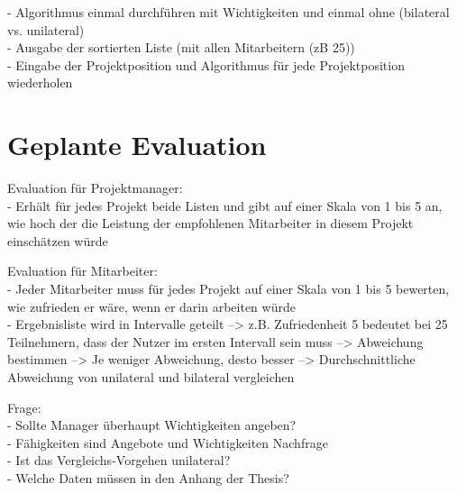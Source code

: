- Algorithmus einmal durchführen mit Wichtigkeiten und einmal ohne (bilateral vs. unilateral)\\
- Ausgabe der sortierten Liste (mit allen Mitarbeitern (zB 25))\\
- Eingabe der Projektposition und Algorithmus für jede Projektposition wiederholen

\section{Geplante Evaluation}
\label{ch:methodik:evaluation}
Evaluation für Projektmanager:\\
- Erhält für jedes Projekt beide Listen und gibt auf einer Skala von 1 bis 5 an, wie hoch der die Leistung der empfohlenen Mitarbeiter in diesem Projekt einschätzen würde

Evaluation für Mitarbeiter:\\
- Jeder Mitarbeiter muss für jedes Projekt auf einer Skala von 1 bis 5 bewerten, wie zufrieden er wäre, wenn er darin arbeiten würde\\
- Ergebnisliste wird in Intervalle geteilt --> z.B. Zufriedenheit 5 bedeutet bei 25 Teilnehmern, dass der Nutzer im ersten Intervall sein muss --> Abweichung bestimmen --> Je weniger Abweichung, desto besser --> Durchschnittliche Abweichung von unilateral und bilateral vergleichen

Frage:\\
- Sollte Manager überhaupt Wichtigkeiten angeben?\\
	- Fähigkeiten sind Angebote und Wichtigkeiten Nachfrage\\
- Ist das Vergleichs-Vorgehen unilateral?\\
- Welche Daten müssen in den Anhang der Thesis?
